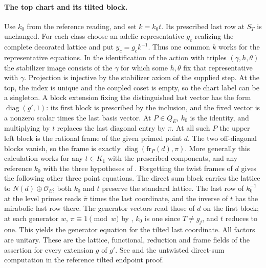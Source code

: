 \paragraph{The top chart and its tilted block.}
Use $k_0$ from the reference reading, and set $k=k_0t$. Its prescribed
last row at $S_T$ is unchanged. For each class choose an adelic
representative $g_c$ realizing the complete decorated lattice and put
$y_c=g_c k^{-1}$. Thus one common $k$ works for the representative
equations. In the identification of the action with triples
$(\gamma,h,\theta)$ the stabilizer image consists of the $\gamma$ for
which some $h,\theta$ fix that representative with $\gamma$. Projection
is injective by the stabilizer axiom of the supplied step. At the top,
the index is unique and the coupled coset is empty, so the chart label
can be a singleton. A block extension fixing the distinguished last
vector has the form $\operatorname{diag}(g',1)$: its first block is
prescribed by the inclusion, and the fixed vector is a nonzero scalar
times the last basis vector. At $P\in Q_E$, $k_0$ is the identity, and
multiplying by $t$ replaces the last diagonal entry by $\pi$. At all such $P$ the upper left
block is the rational frame of the given primed point $d$. The two
off-diagonal blocks vanish, so the frame is exactly
$\operatorname{diag}(\mathrm{fr}_P(d),\pi)$. More generally this
calculation works for any $t\in K_1$ with the prescribed components,
and any reference $k_0$ with the three hypotheses of
.
Forgetting the twist frames of $d$ gives the following other three
point equations. The direct sum block carries the lattice to
$N(d)\oplus\mathcal O_E$; both $k_0$ and $t$ preserve the standard
lattice. The last row of $k_0^{-1}$ at the level primes reads
$\bar\pi$ times the last coordinate, and the inverse of $t$ has the
mirabolic last row there. The generator vectors read those of $d$ on
the first block; at each generator $w$, $\pi\equiv1\pmod w$ by
, $k_0$ is one since $T\ne g_j$, and $t$ reduces to
one. This yields the generator equation for the tilted last coordinate.
All factors are unitary. These are the lattice, functional, reduction
and frame fields of the assertion for every extension $g$ of $g'$.
See  and the
untwisted direct-sum computation in the reference tilted endpoint proof.

